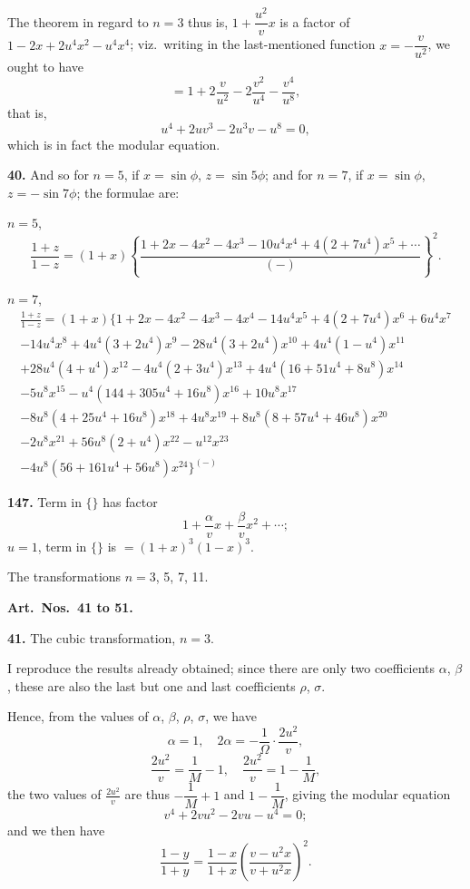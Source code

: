 \documentclass[11pt,a4paper]{article}
\theoremstyle{plain}
\begin{document}
The theorem in regard to $n = 3$ thus is, $1 + \dfrac{u^2}{v}x$ is a factor of $1 - 2x + 2u^4x^2 - u^4x^4$; viz.\ writing in the last-mentioned function $x = -\dfrac{v}{u^2}$, we ought to have
\[
= 1 + 2\frac{v}{u^2} - 2\frac{v^2}{u^4} - \frac{v^4}{u^8},
\]
that is,
\[
u^4 + 2uv^3 - 2u^3v - u^8 = 0,
\]
which is in fact the modular equation.

\medskip
\noindent\textbf{40.} And so for $n = 5$, if $x = \sin\phi$, $z = \sin 5\phi$; and for $n = 7$, if $x = \sin\phi$, $z = -\sin 7\phi$; the formulae are:

\medskip
$n = 5$,
\[
\frac{1 + z}{1 - z} = (1 + x)\left\{\frac{1 + 2x - 4x^2 - 4x^3 - 10u^4x^4 + 4(2 + 7u^4)x^5 + \cdots}{(-)}\right\}^2.
\]

$n = 7$,
\begin{multline*}
\frac{1 + z}{1 - z} = (1 + x)\{1 + 2x - 4x^2 - 4x^3 - 4x^4 - 14u^4x^5 + 4(2 + 7u^4)x^6 + 6u^4x^7 \\
- 14u^4x^8 + 4u^4(3 + 2u^4)x^9 - 28u^4(3 + 2u^4)x^{10} + 4u^4(1 - u^4)x^{11} \\
+ 28u^4(4 + u^4)x^{12} - 4u^4(2 + 3u^4)x^{13} + 4u^4(16 + 51u^4 + 8u^8)x^{14} \\
- 5u^8x^{15} - u^4(144 + 305u^4 + 16u^8)x^{16} + 10u^8x^{17} \\
- 8u^8(4 + 25u^4 + 16u^8)x^{18} + 4u^8x^{19} + 8u^8(8 + 57u^4 + 46u^8)x^{20} \\
- 2u^8x^{21} + 56u^8(2 + u^4)x^{22} - u^{12}x^{23} \\
- 4u^8(56 + 161u^4 + 56u^8)x^{24}\}^{(-)}
\end{multline*}


\noindent\textbf{147.} Term in $\{\}$ has factor
\[
1 + \frac{\alpha}{v}x + \frac{\beta}{v}x^2 + \cdots;
\]
$u = 1$, term in $\{\}$ is $= (1 + x)^3(1 - x)^3$.

The transformations $n = 3$, 5, 7, 11.

\medskip
\noindent\textbf{Art.~Nos.~41 to 51.}

\medskip
\noindent\textbf{41.} The cubic transformation, $n = 3$.

I reproduce the results already obtained; since there are only two coefficients $\alpha$, $\beta$, these are also the last but one and last coefficients $\rho$, $\sigma$.

Hence, from the values of $\alpha$, $\beta$, $\rho$, $\sigma$, we have
\[
\alpha = 1, \quad 2\alpha = -\frac{1}{\Omega} \cdot \frac{2u^2}{v},
\]
\[
\frac{2u^2}{v} = \frac{1}{M} - 1, \quad \frac{2u^2}{v} = 1 - \frac{1}{M},
\]
the two values of $\frac{2u^2}{v}$ are thus $-\dfrac{1}{M} + 1$ and $1 - \dfrac{1}{M}$, giving the modular equation
\[
v^4 + 2vu^2 - 2vu - u^4 = 0;
\]
and we then have
\[
\frac{1 - y}{1 + y} = \frac{1 - x}{1 + x}\left(\frac{v - u^2x}{v + u^2x}\right)^2.
\]
\end{document}
